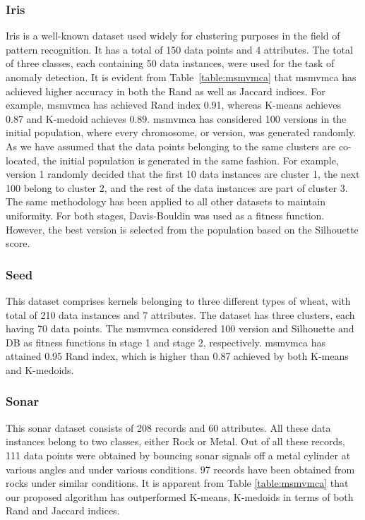 \documentclass[fleqn,usenatbib]{mnras}
\begin{document}
\subsubsection{Iris}

Iris is a well-known dataset used widely for clustering purposes in the field of pattern recognition. It has a total of 150 data points and 4 attributes. The total of three classes, each containing 50 data instances, were used for the task of anomaly detection. It is evident from Table~\ref{table:msmvmca} that \acrshort{msmvmca} has achieved higher accuracy in both the Rand as well as Jaccard indices. For example, \acrshort{msmvmca} has achieved Rand index 0.91, whereas K-means achieves 0.87 and K-medoid achieves 0.89. \acrshort{msmvmca} has considered 100 versions in the initial population, where every chromosome, or version, was generated randomly. As we have assumed that the data points belonging to the same clusters are co-located, the initial population is generated in the same fashion. For example, version 1 randomly decided that the first 10 data instances are cluster 1, the next 100 belong to cluster 2, and the rest of the data instances are part of cluster 3. The same methodology has been applied to all other datasets to maintain uniformity. For both stages, Davis-Bouldin was used as a fitness function. However, the best version is selected from the population based on the Silhouette score.

\subsubsection{Seed}
This dataset comprises kernels belonging to three different types of wheat, with total of 210 data instances and 7 attributes. The dataset has three clusters, each having 70 data points. The \acrshort{msmvmca} considered 100 version and Silhouette and DB as fitness functions in stage 1 and stage 2, respectively.
\acrshort{msmvmca} has attained 0.95 Rand index, which is higher than 0.87 achieved by both K-means and K-medoids.

\subsubsection{Sonar}

This sonar dataset consists of 208 records and 60 attributes. All these data instances belong to two classes, either Rock or Metal. Out of all these records, 111 data points were obtained by bouncing sonar signals off a metal cylinder at various angles and under various conditions. 97 records have been obtained from rocks under similar conditions. It is apparent from Table \ref{table:msmvmca} that our proposed algorithm has outperformed K-means, K-medoids in terms of both Rand and Jaccard indices.  
\end{document}
